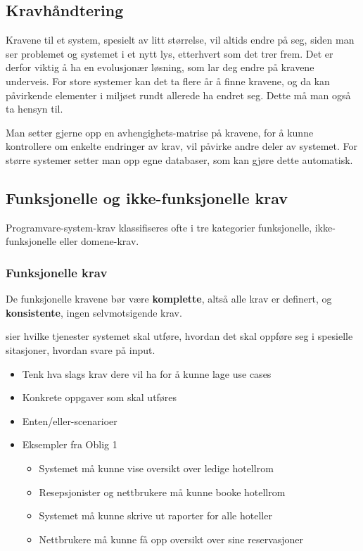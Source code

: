 \documentclass[11pt]{article}
\begin{document}
\subsection{Kravhåndtering}
\label{sec-6.4}

   Kravene til et system, spesielt av litt størrelse, vil altids endre på
   seg, siden man ser problemet og systemet i et nytt lys, etterhvert som
   det trer frem. Det er derfor viktig å ha en evolusjonær løsning, som
   lar deg endre på kravene underveis. For store systemer kan det ta
   flere år å finne kravene, og da kan påvirkende elementer i miljøet
   rundt allerede ha endret seg. Dette må man også ta hensyn til.

   Man setter gjerne opp en avhengighets-matrise på kravene, for å kunne
   kontrollere om enkelte endringer av krav, vil påvirke andre deler av
   systemet. For større systemer setter man opp egne databaser, som kan
   gjøre dette automatisk.
\subsection{Funksjonelle og ikke-funksjonelle krav}
\label{sec-6.5}

   Programvare-system-krav klassifiseres ofte i tre kategorier funksjonelle, ikke-funksjonelle eller domene-krav.
\subsubsection{Funksjonelle krav}
\label{sec-6.5.1}

    De funksjonelle kravene bør være \textbf{komplette}, altså alle krav er definert, og \textbf{konsistente}, ingen selvmotsigende krav.

    sier hvilke tjenester systemet skal utføre, hvordan det skal oppføre seg i spesielle sitasjoner, hvordan svare på input.

\begin{itemize}
\item Tenk hva slags krav dere vil ha for å kunne lage use cases
\item Konkrete oppgaver som skal utføres
\item Enten/eller-scenarioer
\end{itemize}
\begin{itemize}

\item Eksempler fra Oblig 1
\label{sec-6.5.1.1}%
\begin{itemize}
\item Systemet må kunne vise oversikt over ledige hotellrom
\item Resepsjonister og nettbrukere må kunne booke hotellrom
\item Systemet må kunne skrive ut raporter for alle hoteller
\item Nettbrukere må kunne få opp oversikt over sine reservasjoner
\end{itemize}
\end{itemize} %
\end{document}
